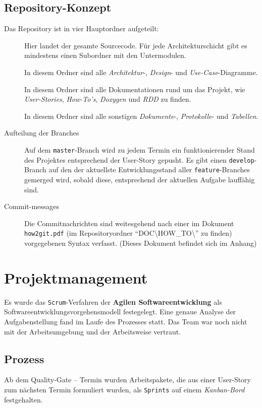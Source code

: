 \documentclass[
   draft=false
  ,paper=a4
  ,twoside=true
  ,fontsize=11pt
  ,headsepline
  ,DIV11
  ,parskip=full+
]{scrartcl} %
\begin{document}
\subsection{Repository-Konzept}
Das Repository ist in vier Hauptordner aufgeteilt:
\begin{description}
\item[] 
Hier landet der gesamte Sourcecode. Für jede Architekturschicht gibt es mindestens einen Subordner mit den Untermodulen.
\item[] In diesem Ordner sind alle \emph{Architektur}-, \emph{Design}- und \emph{Use-Case}-Diagramme.
\item[] In diesem Ordner sind alle Dokumentationen rund um das Projekt, wie \emph{User-Stories}, \emph{How-To's}, \emph{Doxygen} und \emph{RDD} zu finden.
\item[] In diesem Ordner sind alle sonstigen \emph{Dokumente}-, \emph{Protokolle}- und \emph{Tabellen}.

\item[Aufteilung der Branches] Auf dem \texttt{master}-Branch wird zu jedem Termin ein funktionierender Stand des Projektes entsprechend der User-Story gepusht. Es gibt einen \texttt{develop}-Branch auf den der aktuellste Entwicklungsstand aller \texttt{feature}-Branches gemerged wird, sobald diese, entsprechend der aktuellen Aufgabe lauffähig sind.

\item[Commit-messages] Die Commitnachrichten sind weitesgehend nach einer im Dokument \texttt{how2git.pdf} (im Repositoryordner ``DOC\textbackslash HOW\_TO\textbackslash'' zu finden) vorgegebenen Syntax verfasst. (Dieses Dokument befindet sich im Anhang)
\end{description}

\section{Projektmanagement}
Es wurde das \texttt{Scrum}-Verfahren der \textbf{Agilen Softwareentwicklung} als Softwareentwicklungsvorgehensmodell festegelegt. Eine genaue Analyse der Aufgabenstellung fand im Laufe des Prozesses statt. Das Team war noch nicht mit der Arbeitsumgebung und der Arbeitsweise vertraut.
\subsection{Prozess}
Ab dem Quality-Gate -- Termin wurden Arbeitspakete, die aus einer User-Story zum nächsten Termin formuliert wurden, als \texttt{Sprints} auf einem \emph{Kanban-Bord} festgehalten.
\end{document}
